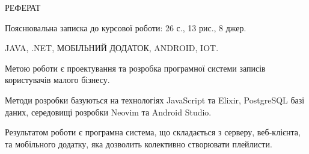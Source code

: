 \begin{center}
  РЕФЕРАТ
\end{center}
\vspace*{\baselineskip}

Пояснювальна записка до курсової роботи: 26 с., 13 рис., 8 джер.

JAVA, .NET, МОБІЛЬНИЙ ДОДАТОК, ANDROID, IOT.
\vspace*{\baselineskip}

Метою роботи є проектування та розробка програмної системи записів користувачів малого бізнесу.

Методи розробки базуються на технологіях JavaScript та Elixir, PostgreSQL базі даних, середовищі розробки Neovim та Android Studio.

Результатом роботи є програмна система, що складається з серверу, веб-клієнта, та мобільного додатку, яка дозволить колективно створювати плейлисти.

\newpage
